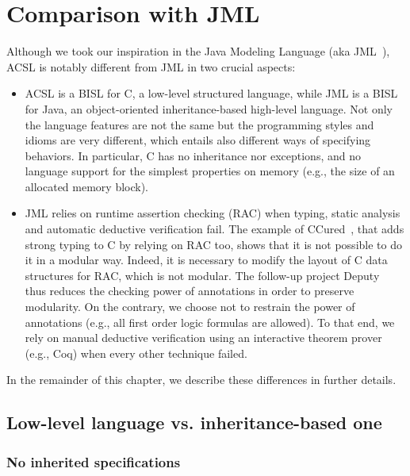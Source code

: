 \section{Comparison with JML}
\label{sec:comp-jml}

Although we took our inspiration in the Java Modeling Language (aka
JML~\cite{jmlhomepage}), ACSL is notably different from JML in
two crucial aspects:

\begin{itemize}
\item ACSL is a BISL for C, a low-level structured language, while JML
  is a BISL for Java, an object-oriented inheritance-based high-level
  language. Not only the language features are not the same but the
  programming styles and idioms are very different, which entails also
  different ways of specifying behaviors. In particular, C has no
  inheritance nor exceptions, and no language support for the simplest
  properties on memory (e.g., the size of an allocated memory block).
\item JML relies on runtime assertion checking (RAC) when typing,
  static analysis and automatic deductive verification fail. The
  example of CCured~\cite{necula02ccured,condit03ccured}, that adds
  strong typing to C by relying on RAC too, shows that it is not possible
  to do it in a modular way. Indeed, it is necessary to modify the
  layout of C data structures for RAC, which is not modular. The
  follow-up project Deputy~\cite{condit07deputy} thus reduces the
  checking power of annotations in order to preserve modularity.  On
  the contrary, we choose not to restrain the power of annotations
  (e.g., all first order logic formulas are allowed). To that end, we
  rely on manual deductive verification using an interactive theorem
  prover (e.g., Coq) when every other technique failed.
\end{itemize}

\noindent
In the remainder of this chapter, we describe these differences in
further details.

\subsection{Low-level language vs. inheritance-based one}

\subsubsection*{No inherited specifications}

